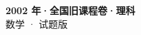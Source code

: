 \documentclass[zihao=-4, a4paper]{ctexart}
\begin{document}
\begin{center}
  {\Large\bfseries 2002 年·全国旧课程卷·理科}\\[4pt]
  {\large 数学 · 试题版}
\end{center}
\medskip
{}

\end{document}
